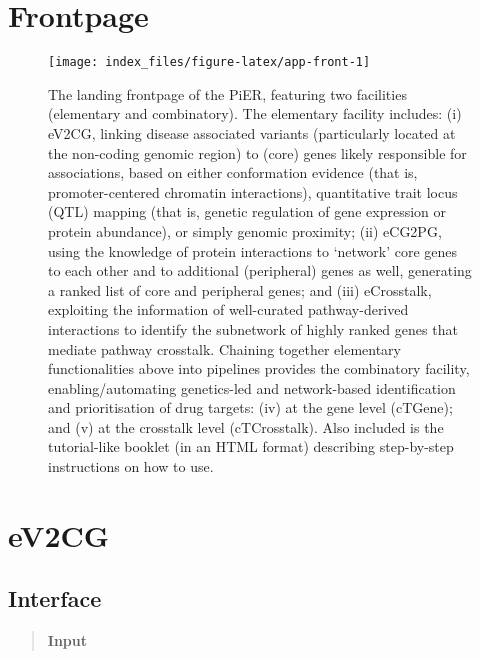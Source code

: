 \documentclass[
  oneside]{book}
\begin{document}
\hypertarget{frontpage}{%
\chapter{Frontpage}\label{frontpage}}

\begin{figure}

{\centering \texttt{[image: index\_files/figure-latex/app-front-1]} 

}

\caption{The landing frontpage of the PiER, featuring two facilities (elementary and combinatory). The elementary facility includes: (i) eV2CG, linking disease associated variants (particularly located at the non-coding genomic region) to (core) genes likely responsible for associations, based on either conformation evidence (that is, promoter-centered chromatin interactions), quantitative trait locus (QTL) mapping (that is, genetic regulation of gene expression or protein abundance), or simply genomic proximity; (ii) eCG2PG, using the knowledge of protein interactions to ‘network’ core genes to each other and to additional (peripheral) genes as well, generating a ranked list of core and peripheral genes; and (iii) eCrosstalk, exploiting the information of well-curated pathway-derived interactions to identify the subnetwork of highly ranked genes that mediate pathway crosstalk. Chaining together elementary functionalities above into pipelines provides the combinatory facility, enabling/automating genetics-led and network-based identification and prioritisation of drug targets: (iv) at the gene level (cTGene); and (v) at the crosstalk level (cTCrosstalk). Also included is the tutorial-like booklet (in an HTML format) describing step-by-step instructions on how to use.}\label{fig:app-front}
\end{figure}

\hypertarget{ev2cg}{%
\chapter{eV2CG}\label{ev2cg}}

\hypertarget{interface}{%
\section{Interface}\label{interface}}

\begin{quote}
\textbf{Input}
\end{quote}
\end{document}
